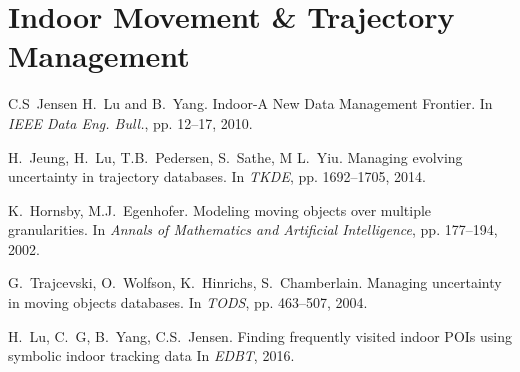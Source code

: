 \documentclass[a4paper, 11pt]{article} %
\begin{document}


\section{Indoor Movement \& Trajectory Management}

\vspace{-25pt} %
\begin{thebibliography}{99}

C.S~Jensen H.~Lu and B.~Yang.
\newblock Indoor-A New Data Management Frontier.
\newblock In {\em IEEE Data Eng. Bull.}, pp. 12--17, 2010.

H.~Jeung, H.~Lu, T.B.~Pedersen, S.~Sathe, M L.~Yiu.
\newblock Managing evolving uncertainty in trajectory databases.
\newblock In {\em TKDE}, pp. 1692--1705, 2014.

K.~Hornsby, M.J.~Egenhofer.
\newblock Modeling moving objects over multiple granularities.
\newblock In {\em Annals of Mathematics and Artificial Intelligence}, pp. 177--194, 2002.

G.~Trajcevski, O.~Wolfson, K.~Hinrichs, S.~Chamberlain.
\newblock Managing uncertainty in moving objects databases.
\newblock In {\em TODS}, pp. 463--507, 2004.

H.~Lu, C.~G, B.~Yang, C.S.~Jensen.
\newblock Finding frequently visited indoor POIs using symbolic indoor tracking data
\newblock In {\em EDBT}, 2016.



\end{thebibliography}
\end{document}
